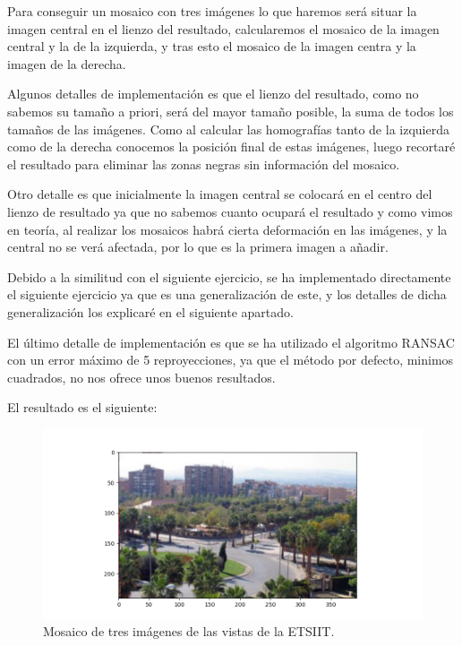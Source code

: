 \documentclass[12pt, spanish]{article}
\begin{document}
Para conseguir un mosaico con tres imágenes lo que haremos será situar la imagen central en el lienzo del resultado, calcularemos el mosaico de la imagen central y la de la izquierda, y tras esto el mosaico de la imagen centra y la imagen de la derecha.

Algunos detalles de implementación es que el lienzo del resultado, como no sabemos su tamaño a priori, será del mayor tamaño posible, la suma de todos los tamaños de las imágenes. Como al calcular las homografías tanto de la izquierda como de la derecha conocemos la posición final de estas imágenes, luego recortaré el resultado para eliminar las zonas negras sin información del mosaico.

Otro detalle es que inicialmente la imagen central se colocará en el centro del lienzo de resultado ya que no sabemos cuanto ocupará el resultado y como vimos en teoría, al realizar los mosaicos habrá cierta deformación en las imágenes, y la central no se verá afectada, por lo que es la primera imagen a añadir.

Debido a la similitud con el siguiente ejercicio, se ha implementado directamente el siguiente ejercicio ya que es una generalización de este, y los detalles de dicha generalización los explicaré en el siguiente apartado.

El último detalle de implementación es que se ha utilizado el algoritmo RANSAC con un error máximo de 5 reproyecciones, ya que el método por defecto, minimos cuadrados, no nos ofrece unos buenos resultados.


El resultado es el siguiente:


\begin{figure}[H]
  \centering
      \includegraphics[width=\textwidth]{mosaico_tres_imagenes.png}
 		\caption{Mosaico de tres imágenes de las vistas de la ETSIIT.}
\end{figure}
\end{document}
